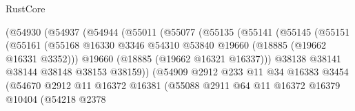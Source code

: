 \begin{lexlean}{RustCore}
\begin{coremodule}
                                (@54930
                                  (@54937
                                    (@54944
                                      (@55011
                                        (@55077
                                          (@55135
                                            (@55141
                                              (@55145
                                                (@55151
                                                  (@55161
                                                    (@55168
                                                      @16330
                                                      @3346
                                                      @54310
                                                      @53840
                                                      @19660
                                                      (@18885 (@19662 @16331 @3352)))
                                                    @19660
                                                    (@18885 (@19662 @16321 @16337)))
                                                  @38138
                                                  @38141
                                                  @38144
                                                  @38148
                                                  @38153
                                                  @38159))
                                              (@54909
                                                @2912
                                                @233
                                                @11
                                                @34
                                                @16383
                                                @3454
                                                (@54670
                                                  @2912
                                                  @11
                                                  @16372
                                                  @16381
                                                  (@55088
                                                    @2911
                                                    @64
                                                    @11
                                                    @16372
                                                    @16379
                                                    @10404
                                                    (@54218
                                                      @2378

\end{coremodule}
\end{lexlean}
